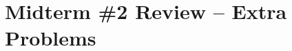 \documentclass[letterpaper, fontsize=12pt]{scrartcl} %
\numberwithin{equation}{section} %
\numberwithin{figure}{section} %
\numberwithin{table}{section} %
\begin{document}

\newcommand{\horrule}[1]{\rule{\linewidth}{#1}} %


\section*{Midterm \#2 Review -- Extra Problems}
\end{document}
